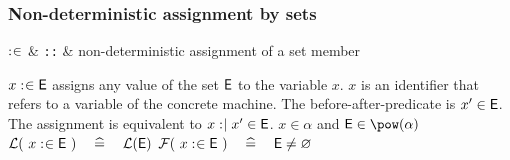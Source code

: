 \begin{samepage}
\subsubsection{Non-deterministic assignment by sets}
\begin{rrnames}
  $\mathrel{:\mkern1mu\in}$ & \texttt{::} & non-deterministic assignment of a set member
\end{rrnames}
\begin{rodinrefentry}
  \rrdesc
    $x \mathrel{:\mkern1mu\in} \textsf{E}$ assigns any value of the
    set $\textsf{E}$ to the variable $x$. $x$ is an identifier that refers to a variable
    of the concrete machine.
  \rrdef
    The before-after-predicate is $x' \in \textsf{E}$. \\
    The assignment is equivalent to
    $x \mathrel{:\mkern1mu\mid} x' \in \textsf{E}$.
  \rrtypes
    $x\in\alpha$ and $\expre\in\pow(\alpha)$
  \rrwd
    $\mathcal{L}(~x \mathrel{:\mkern1mu\in}\textsf{E}~) \quad\mathrel{\widehat=}\quad \mathcal{L}(\textsf{E})$
  \rrfis
    $\mathcal{F}(~x \mathrel{:\mkern1mu\in} \textsf{E}~) \quad\mathrel{\widehat=}\quad \textsf{E}\neq\mathord\varnothing$
\end{rodinrefentry}
\end{samepage}

